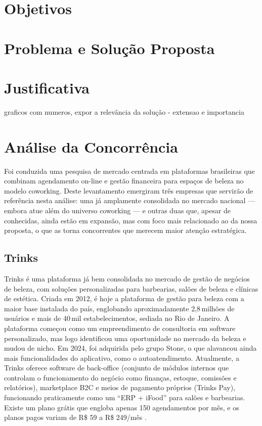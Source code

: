 
\section{Objetivos}
\section{Problema e Solução Proposta}
\section{Justificativa}
graficos com numeros, expor a relevância da solução - extensao e importancia
\section{Análise da Concorrência}

Foi conduzida uma pesquisa de mercado centrada em plataformas brasileiras que combinam agendamento on-line e gestão financeira para espaços de beleza no modelo coworking. Deste levantamento emergiram três empresas que servirão de referência nesta análise: uma já amplamente consolidada no mercado nacional — embora atue além do universo coworking — e outras duas que, apesar de conhecidas, ainda estão em expansão, mas com foco mais relacionado ao da nossa proposta, o que as torna concorrentes que merecem maior atenção estratégica.

\subsection{Trinks}

Trinks é uma plataforma já bem consolidada no mercado de gestão de negócios de beleza, com soluções
personalizadas para barbearias, salões de beleza e clínicas de estética. Criada em 2012, é hoje a
plataforma de gestão para beleza com a maior base instalada do país, englobando aproximadamente
2,8\,milhões de usuários e mais de 40\,mil estabelecimentos, sediada no Rio de Janeiro. A plataforma começou como um empreendimento de consultoria em software personalizado, mas logo identificou uma oportunidade no mercado da beleza e mudou de nicho. Em 2024, foi adquirida pelo grupo Stone, o que alavancou ainda mais funcionalidades do aplicativo, como o autoatendimento.
Atualmente, a Trinks oferece software de back-office (conjunto de módulos internos que controlam o funcionamento do negócio como finanças, estoque, comissões e relatórios), marketplace B2C e meios de pagamento próprios (Trinks Pay), funcionando praticamente como um “ERP + iFood” para salões e barbearias. Existe um
plano grátis que engloba apenas 150 agendamentos por mês, e os planos pagos variam de R\$ 59 a R\$ 249/mês \cite{Trinks}.

